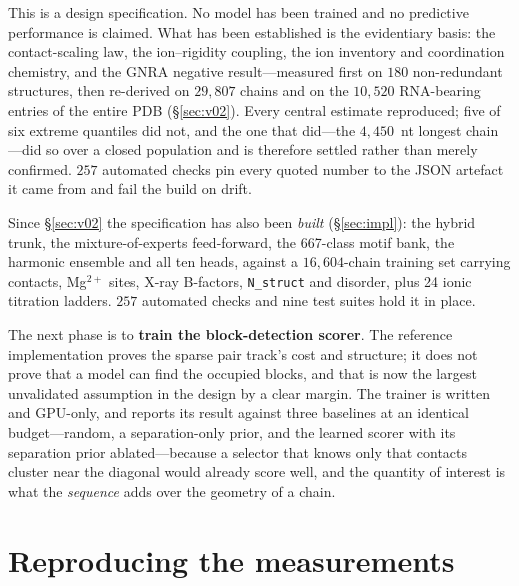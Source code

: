 \documentclass[11pt,a4paper]{article}
\begin{document}
This is a design specification. No model has been trained and no predictive
performance is claimed. What has been established is the evidentiary basis:
the contact-scaling law, the ion--rigidity coupling, the ion inventory and
coordination chemistry, and the GNRA negative result---measured first on $180$
non-redundant structures, then re-derived on $29{,}807$ chains and on the
$10{,}520$ RNA-bearing entries of the entire PDB (\S\ref{sec:v02}). Every
central estimate reproduced; five of six extreme quantiles did not, and the one
that did---the $4{,}450$~nt longest chain---did so over a closed population and
is therefore settled rather than merely confirmed. $257$ automated checks pin
every quoted number to the JSON artefact it came from and fail the build on
drift.

Since \S\ref{sec:v02} the specification has also been \emph{built}
(\S\ref{sec:impl}): the hybrid trunk, the mixture-of-experts feed-forward, the
667-class motif bank, the harmonic ensemble and all ten heads, against a
$16{,}604$-chain training set carrying contacts, Mg$^{2+}$ sites, X-ray
B-factors, \texttt{N\_struct} and disorder, plus 24 ionic titration ladders.
$257$ automated checks and nine test suites hold it in place.

The next phase is to \textbf{train the block-detection scorer}. The reference
implementation proves the sparse pair track's cost and structure; it does not
prove that a model can find the occupied blocks, and that is now the largest
unvalidated assumption in the design by a clear margin. The trainer is written
and GPU-only, and reports its result against three baselines at an identical
budget---random, a separation-only prior, and the learned scorer with its
separation prior ablated---because a selector that knows only that contacts
cluster near the diagonal would already score well, and the quantity of interest
is what the \emph{sequence} adds over the geometry of a chain.

\appendix
\section{Reproducing the measurements}
\end{document}
